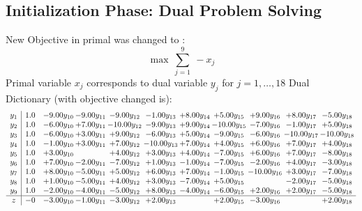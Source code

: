 \documentclass[9pt]{article}
\begin{document}
\subsection{Initialization Phase: Dual Problem Solving}
New Objective in primal was changed to : \[ \max\ \sum_{j=1}^{9}\ - x_j \] 
Primal variable $x_j$ corresponds to dual variable $y_j$ for $j = 1,\ldots,18$
Dual Dictionary (with objective changed is): 
\[\begin{array}{c| c c@{\hskip 2pt} c@{\hskip 2pt} c@{\hskip 2pt} c@{\hskip 2pt} c@{\hskip 2pt} c@{\hskip 2pt} c@{\hskip 2pt} c@{\hskip 2pt} c@{\hskip 2pt} }
 y_{1}   &  1.0 & -9.00 y_{10} & -9.00 y_{11} & -9.00 y_{12} & -1.00 y_{13} & +  8.00 y_{14} & +  5.00 y_{15} & +  9.00 y_{16} & +  8.00 y_{17} & -5.00 y_{18}\\
 y_{2}   &  1.0 & -6.00 y_{10} & +  7.00 y_{11} & -10.00 y_{12} & -9.00 y_{13} & +  9.00 y_{14} & -10.00 y_{15} & -7.00 y_{16} & -1.00 y_{17} & +  5.00 y_{18}\\
 y_{3}   &  1.0 & -6.00 y_{10} & +  3.00 y_{11} & +  9.00 y_{12} & -6.00 y_{13} & +  5.00 y_{14} & -9.00 y_{15} & -6.00 y_{16} & -10.00 y_{17} & -10.00 y_{18}\\
 y_{4}   &  1.0 & -1.00 y_{10} & +  3.00 y_{11} & +  7.00 y_{12} & -10.00 y_{13} & +  7.00 y_{14} & +  4.00 y_{15} & +  6.00 y_{16} & +  7.00 y_{17} & +  4.00 y_{18}\\
 y_{5}   &  1.0 & +  3.00 y_{10} &   & +  4.00 y_{12} & +  3.00 y_{13} & +  4.00 y_{14} & -7.00 y_{15} & +  6.00 y_{16} & +  7.00 y_{17} & -8.00 y_{18}\\
 y_{6}   &  1.0 & +  7.00 y_{10} & -2.00 y_{11} & -7.00 y_{12} & +  1.00 y_{13} & -1.00 y_{14} & -7.00 y_{15} & -2.00 y_{16} & +  4.00 y_{17} & -3.00 y_{18}\\
 y_{7}   &  1.0 & +  8.00 y_{10} & -5.00 y_{11} & +  5.00 y_{12} & +  6.00 y_{13} & +  7.00 y_{14} & -1.00 y_{15} & -10.00 y_{16} & +  3.00 y_{17} & -7.00 y_{18}\\
 y_{8}   &  1.0 & +  1.00 y_{10} & -5.00 y_{11} & +  4.00 y_{12} & +  3.00 y_{13} & -7.00 y_{14} & +  5.00 y_{15} &   & -2.00 y_{17} & -5.00 y_{18}\\
 y_{9}   &  1.0 & -2.00 y_{10} & -4.00 y_{11} & -5.00 y_{12} & +  8.00 y_{13} & -4.00 y_{14} & -6.00 y_{15} & +  2.00 y_{16} & +  2.00 y_{17} & -5.00 y_{18}\\
\hline
z    &  -0 & -3.00 y_{10} & -1.00 y_{11} & -3.00 y_{12} & +  2.00 y_{13} &   & +  2.00 y_{15} & -3.00 y_{16} &   & +  2.00 y_{18}\\
\end{array}\]
\end{document}
